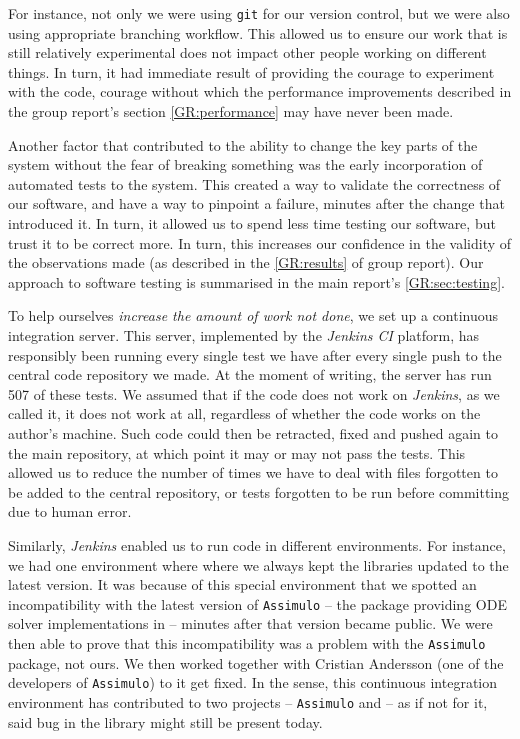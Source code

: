 For instance, not only we were using \verb"git"\cite{git} for our version control, but we were also using appropriate branching workflow. 
This allowed us to ensure our work that is still relatively experimental does not impact other people working on different things. 
In turn, it had immediate result of providing the courage to experiment with the code, courage without which the performance improvements described in the group report's section \autoref*{GR:performance} may have never been made.

Another factor that contributed to the ability to change the key parts of the system without the fear of breaking something was the early incorporation of automated tests to the system. 
This created a way to validate the correctness of our software, and have a way to pinpoint a failure, minutes after the change that introduced it. 
In turn, it allowed us to spend less time testing our software, but trust it to be correct more.
In turn, this increases our confidence in the validity of the observations made (as described in the \autoref*{GR:results} of group report). Our approach to software testing is summarised in the main report's \autoref*{GR:sec:testing}.

To help ourselves \emph{increase the amount of work not done}, we set up a continuous integration server. 
This server, implemented by the \emph{Jenkins CI} platform\cite{_jenkins_????}, has responsibly been running every single test we have after every single push to the central code repository we made. At the moment of writing, the server has run 507 of these tests.
We assumed that if the code does not work on \emph{Jenkins}, as we called it, it does not work at all, regardless of whether the code works on the author's machine. 
Such code could then be retracted, fixed and pushed again to the main repository, at which point it may or may not pass the tests. 
This allowed us to reduce the number of times we have to deal with files forgotten to be added to the central repository, or tests forgotten to be run before committing due to human error.

Similarly, \emph{Jenkins} enabled us to run code in different environments. For instance, we had one environment where where we always kept the libraries updated to the latest version. 
It was because of this special environment that we spotted an incompatibility with the latest version of \verb"Assimulo"\cite{andersson_christian_assimulo:_????} -- the package providing ODE solver implementations in \py{} -- minutes after that version became public. We were then able to prove that this incompatibility was a problem with the \verb"Assimulo" package, not ours. 
We then worked together with Cristian Andersson (one of the developers of \verb"Assimulo") to it get fixed. 
In the sense, this continuous integration environment has contributed to two projects -- \verb"Assimulo" and \means{} -- as if not for it, said bug in the library might still be present today.

